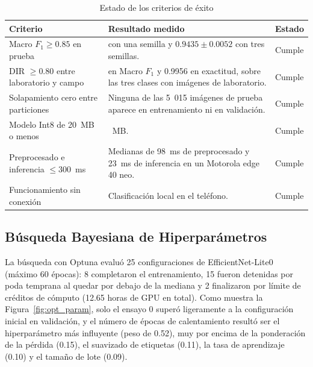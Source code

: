 \begin{table}[H]
\caption{Estado de los criterios de \'exito}
\label{tab:estado_criterios_c3}
\centering
\small
\begin{singlespace}
\begin{tabularx}{\textwidth}{>{\raggedright\arraybackslash}p{3.6cm}>{\raggedright\arraybackslash}X>{\raggedright\arraybackslash}p{2.6cm}}
\toprule
\textbf{Criterio} & \textbf{Resultado medido} & \textbf{Estado} \\
\midrule
Macro $F_1 \ge 0.85$ en prueba & 0.9480 con una semilla y $0.9435 \pm 0.0052$ con tres semillas. & Cumple \\
DIR $\ge 0.80$ entre laboratorio y campo & 0.9636 en Macro $F_1$ y 0.9956 en exactitud, sobre las tres clases con im\'agenes de laboratorio. & Cumple \\
Solapamiento cero entre particiones & Ninguna de las 5~015 im\'agenes de prueba aparece en entrenamiento ni en validaci\'on. & Cumple \\
Modelo Int8 de 20~MB o menos & 3.74~MB. & Cumple \\
Preprocesado e inferencia $\le 300$~ms & Medianas de 98~ms de preprocesado y 23~ms de inferencia en un Motorola edge 40 neo. & Cumple \\
Funcionamiento sin conexi\'on & Clasificaci\'on local en el tel\'efono. & Cumple \\
\bottomrule
\end{tabularx}
\end{singlespace}
\end{table}

\subsection{B\'usqueda Bayesiana de Hiperpar\'ametros}

La b\'usqueda con Optuna evalu\'o 25 configuraciones de EfficientNet-Lite0 (m\'aximo 60 \'epocas): 8 completaron el entrenamiento, 15 fueron detenidas por poda temprana al quedar por debajo de la mediana y 2 finalizaron por l\'imite de cr\'editos de c\'omputo (12.65 horas de GPU en total). Como muestra la Figura~\ref{fig:opt_param}, solo el ensayo 0 super\'o ligeramente a la configuraci\'on inicial en validaci\'on, y el n\'umero de \'epocas de calentamiento result\'o ser el hiperpar\'ametro m\'as influyente (peso de 0.52), muy por encima de la ponderaci\'on de la p\'erdida (0.15), el suavizado de etiquetas (0.11), la tasa de aprendizaje (0.10) y el tama\~no de lote (0.09).

